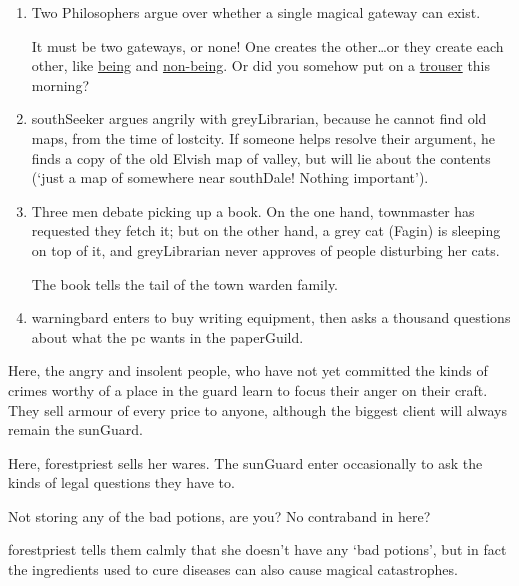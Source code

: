\begin{multicols}{2}
\begin{enumerate}
  \item
  Two Philosophers argue over whether a single magical gateway can exist.
  \begin{speechtext}
    It must be two gateways, or none!
    One creates the other\ldots or they create each other, like \underline{being} and \underline{non-being}.
    Or did you somehow put on a \underline{trouser} this morning?
  \end{speechtext}
  \item
  \Gls{southSeeker} argues angrily with \gls{greyLibrarian}, because he cannot find old maps, from the time of \gls{lostcity}.
  If someone helps resolve their argument, he finds a copy of the old Elvish map of \gls{valley}, but will lie about the contents (`just a map of somewhere near \gls{southDale}! Nothing important').
  \item
  Three men debate picking up a book.
  On the one hand, \gls{townmaster} has requested they fetch it; but on the other hand, a grey cat (Fagin) is sleeping on top of it, and \gls{greyLibrarian} never approves of people disturbing her cats.

  The book tells the tail of the \gls{town} \gls{warden} family.
  \item
  \Gls{warningbard} enters to buy writing equipment, then asks a thousand questions about what the \gls{pc} wants in the \gls{paperGuild}.
\end{enumerate}


Here, the angry and insolent people, who have not yet committed the kinds of crimes worthy of a place in the \gls{guard} learn to focus their anger on their craft.
They sell armour of every price to anyone, although the biggest client will always remain the \gls{sunGuard}.


Here, \gls{forestpriest} sells her wares.
The \gls{sunGuard} enter occasionally to ask the kinds of legal questions they have to.

\begin{speechtext}
  Not storing any of the bad potions, are you?
  No contraband in here?
\end{speechtext}

\Gls{forestpriest} tells them calmly that she doesn't have any `bad potions', but in fact the \glspl{ingredient} used to cure diseases can also cause magical catastrophes.


\end{multicols}
